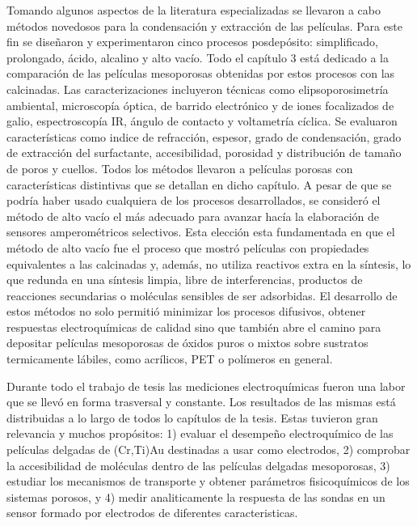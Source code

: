 Tomando algunos aspectos de la literatura especializadas se llevaron a cabo métodos novedosos para la condensación y extracción de las películas. Para este fin se diseñaron y experimentaron cinco procesos posdepósito: simplificado, prolongado, ácido, alcalino y alto vacío. Todo el capítulo 3 está dedicado a la comparación de las películas mesoporosas obtenidas por estos procesos con las calcinadas. Las caracterizaciones incluyeron técnicas como elipsoporosimetría ambiental, microscopía óptica, de barrido electrónico y de iones focalizados de galio, espectroscopía IR, ángulo de contacto y voltametría cíclica. Se evaluaron características como indice de refracción, espesor, grado de condensación, grado de extracción del surfactante, accesibilidad, porosidad y distribución de tamaño de poros y cuellos. Todos los métodos llevaron a películas porosas con características distintivas que se detallan en dicho capítulo. A pesar de que se podría haber usado cualquiera de los procesos desarrollados, se consideró el método de alto vacío el más adecuado para avanzar hacía la elaboración de sensores amperométricos selectivos. Esta elección esta fundamentada en que el método de alto vacío fue el proceso que mostró películas con propiedades equivalentes a las calcinadas y, además, no utiliza reactivos extra en la síntesis, lo que redunda en una síntesis limpia, libre de interferencias, productos de reacciones secundarias o moléculas sensibles de ser adsorbidas. El desarrollo de estos métodos no solo permitió minimizar los procesos difusivos, obtener respuestas electroquímicas de calidad sino que también abre el camino para depositar películas mesoporosas de óxidos puros o mixtos sobre sustratos termicamente lábiles, como acrílicos, PET o polímeros en general.

Durante todo el trabajo de tesis las mediciones electroquímicas fueron una labor que se llevó en forma trasversal y constante. Los resultados de las mismas está distribuidas a lo largo de todos lo capítulos de la tesis. Estas tuvieron gran relevancia y muchos propósitos: 1) evaluar el desempeño electroquímico de las películas delgadas de (Cr,Ti)\textbar Au  destinadas a usar como electrodos, 2) comprobar la accesibilidad de moléculas dentro de las películas delgadas mesoporosas, 3) estudiar los mecanismos de transporte y obtener parámetros fisicoquímicos de los sistemas porosos, y 4) medir analiticamente la respuesta de las sondas en un sensor formado por electrodos de diferentes caracteristicas.

